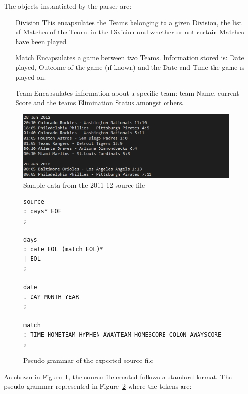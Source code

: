 The objects instantiated by the parser are:
\begin{itemize}
  \item[Division] This encapsulates the Teams belonging to a given
    Division, the list of Matches of the Teams in the Division and
    whether or not certain Matches have been played.
  \item[Match] Encapsulates a game between two Teams. Information
    stored is: Date played, Outcome of the game (if known) and the
    Date and Time the game is played on.
  \item[Team] Encapsulates information about a specific team: team
    Name, current Score and the teams Elimination Status amongst
    others.
\end{itemize}
\pagebreak
\begin{figure}[h]
  \includegraphics[width=\linewidth,keepaspectratio]{images/sourceFileExample.png}
  \caption{Sample data from the 2011-12 source file}\label{fig:BASESRC}
\end{figure}
\begin{figure}[h]
\begin{verbatim}
source
: days* EOF
;

days
: date EOL (match EOL)*
| EOL
;

date
: DAY MONTH YEAR
;

match
: TIME HOMETEAM HYPHEN AWAYTEAM HOMESCORE COLON AWAYSCORE
;
\end{verbatim}

\caption{Pseudo-grammar of the expected source file}\label{fig:GRAMMAR}
\end{figure}
As shown in Figure~\ref{fig:BASESRC}, the source file created follows
a standard format. The pseudo-grammar represented in
Figure~\ref{fig:GRAMMAR} where the tokens are:
